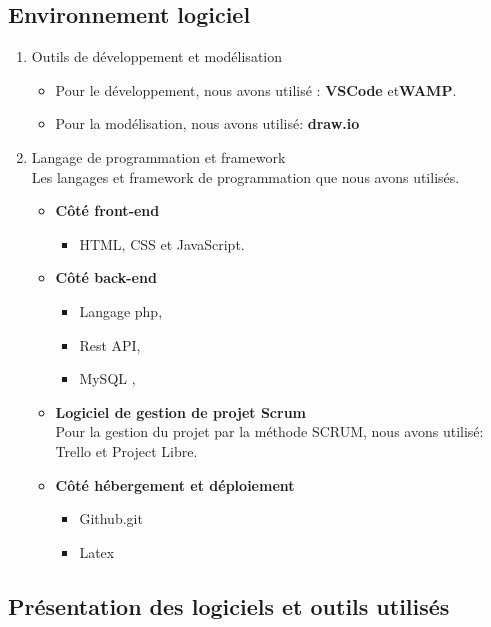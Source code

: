 \subsection{Environnement logiciel}
\begin{enumerate}
	\item Outils de développement et modélisation
	\begin{itemize}
		\item Pour le développement, nous avons utilisé : \textbf{VSCode} et\textbf{WAMP}.
		\item Pour la modélisation, nous avons utilisé: \textbf{draw.io}
	\end{itemize}
	\item Langage de programmation et framework\\
	Les langages et framework de programmation que nous avons utilisés.
	\begin{itemize}
		\item \textbf{Côté front-end}
		\begin{itemize}
			\item HTML, CSS et JavaScript.
		\end{itemize}
		\item \textbf{Côté back-end}
		\begin{itemize}
			\item Langage php,
			\item Rest API,
			\item MySQL , 
		\end{itemize}
    	\item \textbf{Logiciel de gestion de projet Scrum}\\
    	Pour la gestion du projet par la méthode SCRUM, nous avons utilisé: Trello et Project Libre.
		\item \textbf{Côté hébergement et déploiement}
		\begin{itemize}
			\item Github.git
			\item Latex
		\end{itemize}
		
	\end{itemize}
\end{enumerate}
\subsection{Présentation des logiciels et outils utilisés}
	
